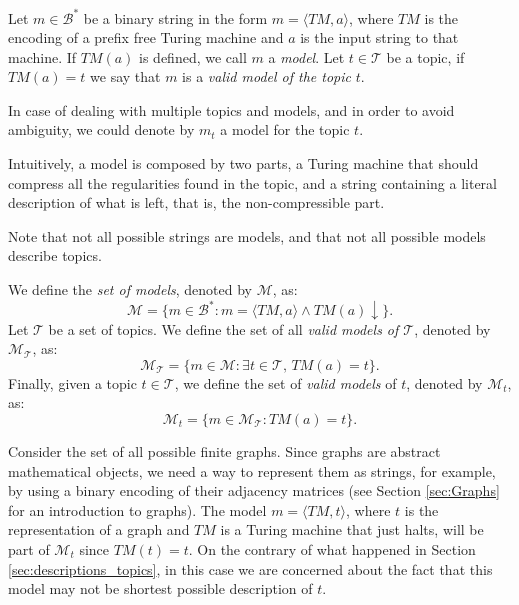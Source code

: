 \begin{definition} [Model]
\label{def:descriptions_model}
Let $m \in \mathcal{B}^\ast$ be a binary string in the form $m = \langle TM,a \rangle$, where $TM$ is the encoding of a prefix free Turing machine and $a$ is the input string to that machine. If $TM(a)$ is defined, we call $m$ a \emph{model}. Let $t \in \mathcal{T}$ be a topic, if $TM(a) = t$ we say that $m$ is a \emph{valid model of the topic} $t$.
\end{definition}

\begin{notation}
In case of dealing with multiple topics and models, and in order to avoid ambiguity, we could denote by $m_t$ a model for the topic $t$.
\end{notation}

Intuitively, a model is composed by two parts, a Turing machine that should compress all the regularities found in the topic, and a string containing a literal description of what is left, that is, the non-compressible part.

Note that not all possible strings are models, and that not all possible models describe topics.

\begin{definition}
\label{def:descriptions_model}
We define the \emph{set of models}, denoted by $\mathcal{M}$, as:
\[
\mathcal{M} = \{ m \in \mathcal{B}^\ast : m = \langle TM,a \rangle \wedge TM(a) \downarrow \}.
\]
Let $\mathcal{T}$ be a set of topics. We define the set of all \emph{valid models of $\mathcal{T}$}, denoted by $\mathcal{M}_{\mathcal{T}}$, as:
\[
\mathcal{M}_{\mathcal{T}} = \{ m \in \mathcal{M} : \exists t \in \mathcal{T},\, TM(a) = t \}.
\]
Finally, given a topic $t \in \mathcal{T}$, we define the set of \emph{valid models} of $t$, denoted by $\mathcal{M}_t$, as:
\[
\mathcal{M}_t = \{ m \in \mathcal{M}_{\mathcal{T}} : TM(a) = t \}.
\]
\end{definition}

\begin{example}
\label{ex:topics_models_graph}
Consider the set of all possible finite graphs. Since graphs are abstract mathematical objects, we need a way to represent them as strings, for example, by using a binary encoding of their adjacency matrices (see Section \ref{sec:Graphs} for an introduction to graphs). The model $m = \langle TM, t \rangle$, where $t$ is the representation of a graph and $TM$ is a Turing machine that just halts, will be part of $\mathcal{M}_t$ since $TM(t) = t$. On the contrary of what happened in Section \ref{sec:descriptions_topics}, in this case we are concerned about the fact that this model may not be shortest possible description of $t$.
\end{example}

